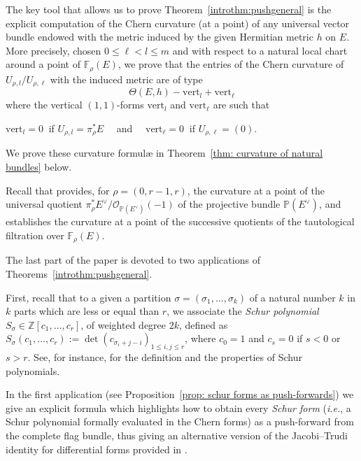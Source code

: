 \documentclass[a4paper]{amsart}
\theoremstyle{plain}%
\theoremstyle{definition}
\theoremstyle{remark}
\newcommand{\Z}{\mathbb{Z}}
\newcommand{\PP}{\mathbb{P}}
\newcommand{\FF}{\mathbb{F}}
\begin{document}
	The key tool that allows us to prove Theorem~\ref{introthm:pushgeneral} is the explicit computation of the Chern curvature (at a point) of any universal vector bundle endowed with the metric induced by the given Hermitian metric $ h $ on $ E $.
	More precisely, chosen $ 0 \le \ell < l \le m $ and with respect to a natural local chart around a point of $ \FF_{\rho}(E) $, we prove that the entries of the Chern curvature of $ U_{\rho,{l}} / U_{\rho,{\ell}} $ with the induced metric are of type
	\[
	\Theta(E,h) - \textrm{vert}_{l} + \textrm{vert}_{\ell}
	\]
	where the vertical $ (1,1) $-forms $ \textrm{vert}_{l} $ and $ \textrm{vert}_{\ell} $ are such that
	\begin{center}
		$ \textrm{vert}_{l} = 0 \ $ if $ U_{\rho,l} = \pi_{\rho}^{*} E \quad $ and $ \quad \textrm{vert}_{\ell} = 0 \ $ if $ U_{\rho,{\ell}} = (0) $.
	\end{center}
	We prove these curvature formul{\ae} in Theorem~\ref{thm: curvature of natural bundles} below.
	
	Recall that \cite[Formula~(2.1)]{Mou04} provides, for $ \rho = (0,r-1,r) $, the curvature at a point of the universal quotient $ \pi_{\rho}^{*} E^{\vee} / \mathcal{O}_{\PP(E^{\vee})}(-1) $ of the projective bundle $ \PP(E^{\vee}) $, and \cite[Formula~{(4.9)}]{Dem88} establishes the curvature at a point of the successive quotients of the tautological filtration over $ \FF_{\rho}(E) $.
	
	\medskip
	The last part of the paper is devoted to two applications of Theorems~\ref{introthm:pushgeneral}.
	
	First, recall that to a given a partition $ \sigma = (\sigma_{1},\dots,\sigma_{k}) $ of a natural number $ k $ in $ k $ parts which are less or equal than $ r $, we associate the \emph{Schur polynomial} $ S_{\sigma} \in \Z[c_1,\ldots,c_r] $, of weighted degree $ 2k $, defined as $ S_{\sigma}(c_1,\ldots,c_r) := \det\left( c_{\sigma_i + j - i} \right)_{1 \le i,j \le r} $, where $ c_0 = 1 $ and $ c_s = 0 $ if $ s<0 $ or $ s>r $.
	See, for instance, \cite{Ful97} for the definition and the properties of Schur polynomials.
	
	In the first application (see Proposition~\ref{prop: schur forms as push-forwards}) we give an explicit formula which highlights how to obtain every \emph{Schur form} (\textsl{i.e.}, a Schur polynomial formally evaluated in the Chern forms) as a push-forward from the complete flag bundle, thus giving an alternative version of the Jacobi--Trudi identity for differential forms provided in \cite[Theorem~{A.2}]{Fin20}.
	
\end{document}
